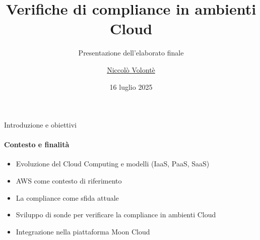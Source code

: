 \documentclass{beamer}
\title{Verifiche di compliance in ambienti Cloud}
\subtitle{Presentazione dell'elaborato finale}
\author{\href{mailto:niccolo.volonte@studenti.unimi.it}{Niccolò Volontè}}
\date{16 luglio 2025}
\begin{document}
\maketitle




\begin{frame}{Introduzione e obiettivi}
    \framesubtitle{Contesto e finalità}
    \begin{itemize}
        \item<1-> Evoluzione del Cloud Computing e modelli (IaaS, PaaS, SaaS)
        \item<2-> AWS come contesto di riferimento
        \item<3-> La compliance come sfida attuale
        \item<4-> Sviluppo di sonde per verificare la compliance in ambienti Cloud
        \item<5-> Integrazione nella piattaforma Moon Cloud
    \end{itemize}
\end{frame}
\end{document}
